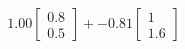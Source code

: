 \documentclass[preview]{standalone}
\begin{document}
\begin{align*}
1.00 \begin{bmatrix} 0.8 \\ 0.5 \end{bmatrix} + -0.81 \begin{bmatrix} 1 \\ 1.6 \end{bmatrix}
\end{align*}
\end{document}
